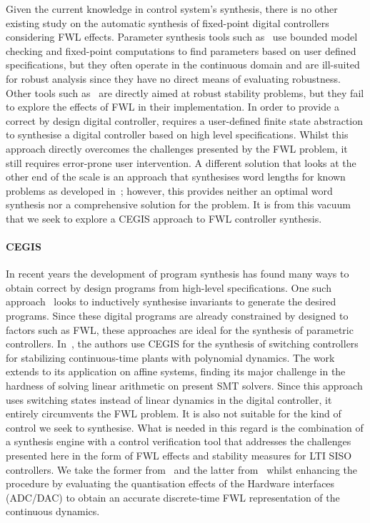 \documentclass{sig-alternate-05-2015}
\begin{document}
Given the current knowledge in control system's synthesis, there is no other
existing study on the automatic synthesis of fixed-point digital controllers
considering FWL effects.  Parameter synthesis tools such
as~\cite{cimatti2013parameter} use bounded model checking and fixed-point
computations to find parameters based on user defined specifications, but
they often operate in the continuous domain and are ill-suited for robust
analysis since they have no direct means of evaluating robustness.  Other
tools such as~\cite{economakos2016automated} are directly aimed at robust
stability problems, but they fail to explore the effects of FWL in their
implementation.  In order to provide a correct by design digital controller,
\cite{alur2016compositional} requires a user-defined finite state
abstraction to synthesise a digital controller based on high level
specifications.  Whilst this approach directly overcomes the challenges
presented by the FWL problem, it still requires error-prone user
intervention.  A different solution that looks at the other end of the scale
is an approach that synthesises word lengths for known problems as developed
in~\cite{jha2013swati}; however, this provides neither an optimal word
synthesis nor a comprehensive solution for the problem.  It is from this
vacuum that we seek to explore a CEGIS approach to FWL controller synthesis.

\paragraph{CEGIS}

In recent years the development of program synthesis has found many ways to
obtain correct by design programs from high-level specifications.  One such
approach~\cite{itzhaky2010simple} looks to inductively synthesise invariants
to generate the desired programs.  Since these digital programs are already
constrained by designed to factors such as FWL, these approaches are ideal
for the synthesis of parametric controllers. 
In~\cite{DBLP:conf/cdc/RavanbakhshS15}, the authors use CEGIS for the
synthesis of switching controllers for stabilizing continuous-time plants
with polynomial dynamics.  The work extends to its application on affine
systems, finding its major challenge in the hardness of solving linear
arithmetic on present SMT solvers.  Since this approach uses switching
states instead of linear dynamics in the digital controller, it entirely
circumvents the FWL problem.  It is also not suitable for the kind of
control we seek to synthesise.  What is needed in this regard is the
combination of a synthesis engine with a control verification tool that
addresses the challenges presented here in the form of FWL effects and
stability measures for LTI SISO controllers.  We take the former
from~\cite{DBLP:conf/lpar/DavidKL15} and the latter from~\cite{daes20161}
whilst enhancing the procedure by evaluating the quantisation effects of
the Hardware interfaces (ADC/DAC) to obtain an accurate discrete-time FWL
representation of the continuous dynamics.
 
\end{document}

